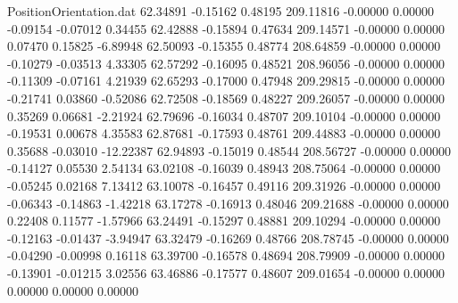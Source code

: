 \begin{filecontents}{PositionOrientation.dat}
  62.34891   -0.15162    0.48195   209.11816   -0.00000    0.00000   -0.09154   -0.07012    0.34455
  62.42888   -0.15894    0.47634   209.14571   -0.00000    0.00000    0.07470    0.15825   -6.89948
  62.50093   -0.15355    0.48774   208.64859   -0.00000    0.00000   -0.10279   -0.03513    4.33305
  62.57292   -0.16095    0.48521   208.96056   -0.00000    0.00000   -0.11309   -0.07161    4.21939
  62.65293   -0.17000    0.47948   209.29815   -0.00000    0.00000   -0.21741    0.03860   -0.52086
  62.72508   -0.18569    0.48227   209.26057   -0.00000    0.00000    0.35269    0.06681   -2.21924
  62.79696   -0.16034    0.48707   209.10104   -0.00000    0.00000   -0.19531    0.00678    4.35583
  62.87681   -0.17593    0.48761   209.44883   -0.00000    0.00000    0.35688   -0.03010  -12.22387
  62.94893   -0.15019    0.48544   208.56727   -0.00000    0.00000   -0.14127    0.05530    2.54134
  63.02108   -0.16039    0.48943   208.75064   -0.00000    0.00000   -0.05245    0.02168    7.13412
  63.10078   -0.16457    0.49116   209.31926   -0.00000    0.00000   -0.06343   -0.14863   -1.42218
  63.17278   -0.16913    0.48046   209.21688   -0.00000    0.00000    0.22408    0.11577   -1.57966
  63.24491   -0.15297    0.48881   209.10294   -0.00000    0.00000   -0.12163   -0.01437   -3.94947
  63.32479   -0.16269    0.48766   208.78745   -0.00000    0.00000   -0.04290   -0.00998    0.16118
  63.39700   -0.16578    0.48694   208.79909   -0.00000    0.00000   -0.13901   -0.01215    3.02556
  63.46886   -0.17577    0.48607   209.01654   -0.00000    0.00000    0.00000    0.00000    0.00000
\end{filecontents}
